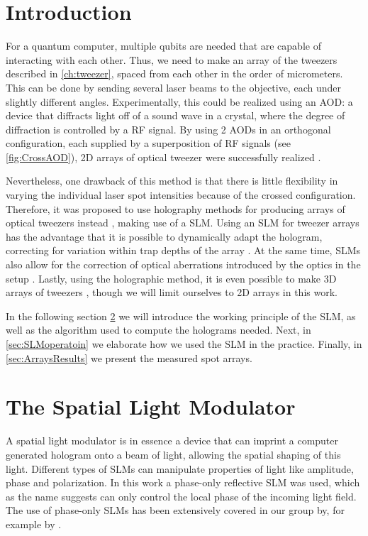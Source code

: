\section{Introduction}

For a quantum computer, multiple qubits are needed that are capable of interacting with each other. 
Thus, we need to make an array of the tweezers described in \cref{ch:tweezer}, spaced from each other in the order of micrometers. 
This can be done by sending several laser beams to the objective, each under slightly different angles. 
Experimentally, this could be realized using an \ac{AOD}: a device that diffracts light off of a sound wave in a crystal, where the degree of diffraction is controlled by a \ac{RF} signal. 
By using 2 AODs in an orthogonal configuration, each supplied by a superposition of RF signals (see \cref{fig:CrossAOD}), 2D arrays of optical tweezer were successfully realized \cite{Manuel2016}. 

Nevertheless, one drawback of this method is that there is little flexibility in varying the individual laser spot intensities because of the crossed configuration.
Therefore, it was proposed to use holography methods for producing arrays of optical tweezers instead \cite{Bergamini2004}, making use of a \acf{SLM}.
Using an SLM for tweezer arrays has the advantage that it is possible to dynamically adapt the hologram, correcting for variation within trap depths of the array \cite{Nogrette2014}. 
At the same time, SLMs also allow for the correction of optical aberrations introduced by the optics in the setup \cite{Bijnen2015}.
Lastly, using the holographic method, it is even possible to make 3D arrays of tweezers \cite{DiLeonardo2007,Barredo2016}, though we will limit ourselves to 2D arrays in this work.

In the following section \ref{sec:SLM} we will introduce the working principle of the SLM, as well as the algorithm used to compute the holograms needed.
Next, in \cref{sec:SLMoperatoin} we elaborate how we used the SLM in the practice. 
Finally, in \cref{sec:ArraysResults} we present the measured spot arrays.



\section{The Spatial Light Modulator}\label{sec:SLM}

A spatial light modulator is in essence a device that can imprint a computer generated hologram onto a beam of light, allowing the spatial shaping of this light.
Different types of SLMs can manipulate properties of light like amplitude, phase and polarization.
In this work a phase-only reflective SLM was used, which as the name suggests can only control the local phase of the incoming light field.
The use of phase-only SLMs has been extensively covered in our group by, for example by \cite{Bijnen2015,Dijk2012,Bijnen2013}. 

